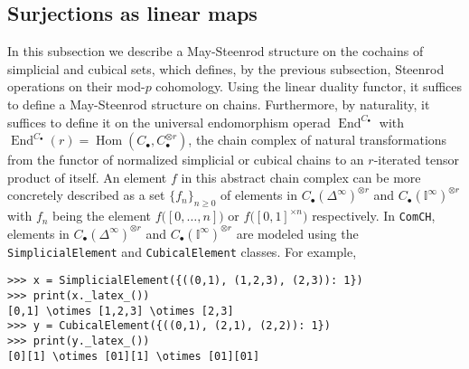 \documentclass{amsart}
\newcommand{\chains}{C_\bullet}
\newcommand{\comch}{\texttt{ComCH}}
\DeclareMathOperator{\Hom}{Hom}
\DeclareMathOperator{\End}{End}
\begin{document}
\subsection{Surjections as linear maps}

In this subsection we describe a May-Steenrod structure on the cochains of simplicial and cubical sets, which defines, by the previous subsection, Steenrod operations on their mod-$p$ cohomology.
Using the linear duality functor, it suffices to define a May-Steenrod structure on chains.
Furthermore, by naturality, it suffices to define it on the universal endomorphism operad $\End^{\chains}$ with $\End^{\chains}(r) =  \Hom(\chains, \chains^{\otimes r})$, the chain complex of natural transformations from the functor of normalized simplicial or cubical chains to an $r$-iterated tensor product of itself.
An element $f$ in this abstract chain complex can be more concretely described as a set $\{f_n\}_{n \geq 0}$ of elements in $\chains(\Delta^{\!\infty})^{\otimes r}$ and $\chains(\mathbb I^\infty)^{\otimes r}$ with $f_n$ being the element $f \big( [0, \dots, n] \big)$ or $f \big( [0 ,1]^{\times n} \big)$ respectively.
In \comch, elements in $\chains(\Delta^{\!\infty})^{\otimes r}$ and $\chains(\mathbb I^\infty)^{\otimes r}$ are modeled using the \texttt{SimplicialElement} and \texttt{CubicalElement} classes.
For example,

\begin{Verbatim}[frame=lines, samepage=true]
>>> x = SimplicialElement({((0,1), (1,2,3), (2,3)): 1})
>>> print(x._latex_())
[0,1] \otimes [1,2,3] \otimes [2,3]
>>> y = CubicalElement({((0,1), (2,1), (2,2)): 1})
>>> print(y._latex_())
[0][1] \otimes [01][1] \otimes [01][01]
\end{Verbatim}
\end{document}
